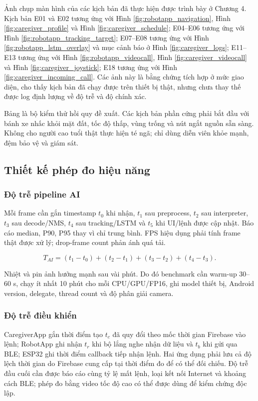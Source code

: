 Ảnh chụp màn hình của các kịch bản đã thực hiện được trình bày ở Chương 4. Kịch bản E01 và E02 tương ứng với Hình \ref{fig:robotapp_navigation}, Hình \ref{fig:caregiver_profile} và Hình \ref{fig:caregiver_schedule}; E04--E06 tương ứng với Hình \ref{fig:robotapp_tracking_target}; E07--E08 tương ứng với Hình \ref{fig:robotapp_lstm_overlay} và mục cảnh báo ở Hình \ref{fig:caregiver_logs}; E11--E13 tương ứng với Hình \ref{fig:robotapp_videocall}, Hình \ref{fig:caregiver_videocall} và Hình \ref{fig:caregiver_joystick}; E18 tương ứng với Hình \ref{fig:caregiver_incoming_call}. Các ảnh này là bằng chứng tích hợp ở mức giao diện, cho thấy kịch bản đã chạy được trên thiết bị thật, nhưng chưa thay thế được log định lượng về độ trễ và độ chính xác.

Bảng là bộ kiểm thử hồi quy đề xuất. Các kịch bản phần cứng phải bắt đầu với bánh xe nhấc khỏi mặt đất, tốc độ thấp, vùng trống và nút ngắt nguồn sẵn sàng. Không cho người cao tuổi thật thực hiện té ngã; chỉ dùng diễn viên khỏe mạnh, đệm bảo vệ và giám sát.

\subsection{Thiết kế phép đo hiệu năng}

\subsubsection{Độ trễ pipeline AI}

Mỗi frame cần gắn timestamp $t_0$ khi nhận, $t_1$ sau preprocess, $t_2$ sau interpreter, $t_3$ sau decode/NMS, $t_4$ sau tracking/LSTM và $t_5$ khi UI/lệnh được cập nhật. Báo cáo median, P90, P95 thay vì chỉ trung bình. FPS hiệu dụng phải tính frame thật được xử lý; drop-frame count phản ánh quá tải.

\begin{equation}
T_{AI}= (t_1-t_0)+(t_2-t_1)+(t_3-t_2)+(t_4-t_3).
\end{equation}

Nhiệt và pin ảnh hưởng mạnh sau vài phút. Do đó benchmark cần warm-up 30--60 s, chạy ít nhất 10 phút cho mỗi CPU/GPU/FP16, ghi model thiết bị, Android version, delegate, thread count và độ phân giải camera.

\subsubsection{Độ trễ điều khiển}

CaregiverApp gắn thời điểm tạo $t_c$ đã quy đổi theo mốc thời gian Firebase vào lệnh; RobotApp ghi nhận $t_r$ khi bộ lắng nghe nhận dữ liệu và $t_b$ khi gửi qua BLE; ESP32 ghi thời điểm callback tiếp nhận lệnh. Hai ứng dụng phải lưu cả độ lệch thời gian do Firebase cung cấp tại thời điểm đo để có thể đối chiếu. Độ trễ đầu cuối cần được báo cáo cùng tỷ lệ mất lệnh, loại kết nối Internet và khoảng cách BLE; phép đo bằng video tốc độ cao có thể được dùng để kiểm chứng độc lập.

